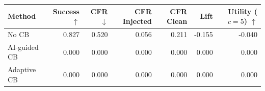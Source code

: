 \begin{tabular}{lrrrrrr}
\toprule
Method & Success $\uparrow$ & CFR $\downarrow$ & CFR Injected & CFR Clean & Lift & Utility ($c=5$) $\uparrow$ \\
\midrule
No CB & 0.827 & 0.520 & 0.056 & 0.211 & -0.155 & -0.040 \\
AI-guided CB & 0.000 & 0.000 & 0.000 & 0.000 & 0.000 & 0.000 \\
Adaptive CB & 0.000 & 0.000 & 0.000 & 0.000 & 0.000 & 0.000 \\
\bottomrule
\end{tabular}
